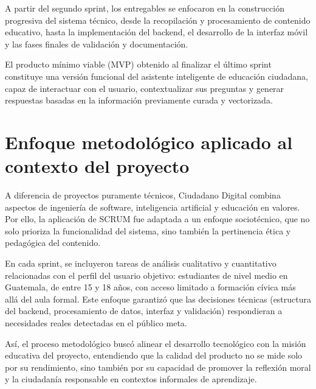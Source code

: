 A partir del segundo sprint, los entregables se enfocaron en la construcción
progresiva del sistema técnico, desde la recopilación y procesamiento de
contenido educativo, hasta la implementación del backend, el desarrollo de la
interfaz móvil y las fases finales de validación y documentación.

El producto mínimo viable (MVP) obtenido al finalizar el último sprint
constituye una versión funcional del asistente inteligente de educación
ciudadana, capaz de interactuar con el usuario, contextualizar sus preguntas y
generar respuestas basadas en la información previamente curada y vectorizada.

\section{Enfoque metodológico aplicado al contexto del proyecto}
A diferencia de proyectos puramente técnicos, Ciudadano Digital combina
aspectos de ingeniería de software, inteligencia artificial y educación en
valores. Por ello, la aplicación de SCRUM fue adaptada a un enfoque
sociotécnico, que no solo prioriza la funcionalidad del sistema, sino también
la pertinencia ética y pedagógica del contenido.

En cada sprint, se incluyeron tareas de análisis cualitativo y cuantitativo
relacionadas con el perfil del usuario objetivo: estudiantes de nivel medio en
Guatemala, de entre 15 y 18 años, con acceso limitado a formación cívica más
allá del aula formal. Este enfoque garantizó que las decisiones técnicas
(estructura del backend, procesamiento de datos, interfaz y validación)
respondieran a necesidades reales detectadas en el público meta.

Así, el proceso metodológico buscó alinear el desarrollo tecnológico con la
misión educativa del proyecto, entendiendo que la calidad del producto no se
mide solo por su rendimiento, sino también por su capacidad de promover la
reflexión moral y la ciudadanía responsable en contextos informales de
aprendizaje.

